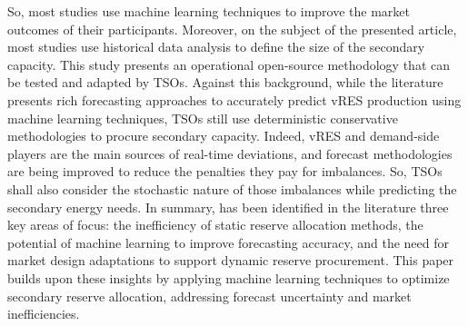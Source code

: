 \textcolor[rgb]{0,0,0.5}{So, most studies use machine learning techniques to improve the market outcomes of their participants. Moreover, on the subject of the presented article, most studies use historical data analysis to define the size of the secondary capacity. This study presents an operational open-source methodology that can be tested and adapted by TSOs. 
Against this background, while the literature presents rich forecasting approaches to accurately predict vRES production using machine learning techniques, TSOs still use deterministic conservative methodologies to procure secondary capacity. Indeed, vRES and demand-side players are the main sources of real-time deviations, and forecast methodologies are being improved to reduce the penalties they pay for imbalances.  So, TSOs shall also consider the stochastic nature of those imbalances while predicting the secondary energy needs.}
In summary, has been identified in the literature three key areas of focus: the inefficiency of static reserve allocation methods, the potential of machine learning to improve forecasting accuracy, and the need for market design adaptations to support dynamic reserve procurement. This paper builds upon these insights by applying machine learning techniques to optimize secondary reserve allocation, addressing forecast uncertainty and market inefficiencies.\par